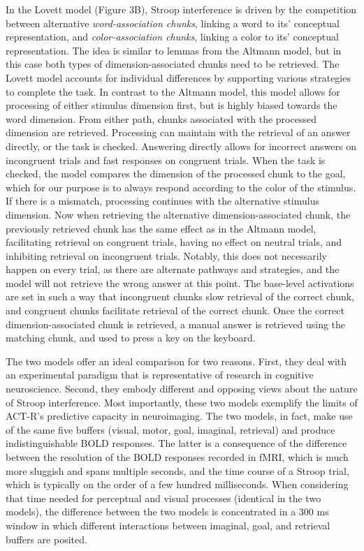 \documentclass[10pt,letterpaper]{article}
\begin{document}
In the Lovett model (Figure 3B), Stroop interference is driven by the competition between alternative \textit{word-association chunks}, linking a word to its' conceptual representation, and \textit{color-association chunks}, linking a color to its' conceptual representation. The idea is similar to lemmas from the Altmann model, but in this case both types of dimension-associated chunks need to be retrieved. The Lovett model accounts for individual differences by supporting various strategies to complete the task. In contrast to the Altmann model, this model allows for processing of either stimulus dimension first, but is highly biased towards the word dimension. From either path, chunks associated with the processed dimension are retrieved. Processing can maintain with the retrieval of an answer directly, or the task is checked. Answering directly allows for incorrect answers on incongruent trials and fast responses on congruent trials. When the task is checked, the model compares the dimension of the processed chunk to the goal, which for our purpose is to always respond according to the color of the stimulus. If there is a mismatch, processing continues with the alternative stimulus dimension. Now when retrieving the alternative dimension-associated chunk, the previously retrieved chunk has the same effect as in the Altmann model, facilitating retrieval on congruent trials, having no effect on neutral trials, and inhibiting retrieval on incongruent trials. Notably, this does not necessarily happen on every trial, as there are alternate pathways and strategies, and the model will not retrieve the wrong answer at this point. The base-level activations are set in such a way that incongruent chunks slow retrieval of the correct chunk, and congruent chunks facilitate retrieval of the correct chunk. Once the correct dimension-associated chunk is retrieved, a manual answer is retrieved using the matching chunk, and used to press a key on the keyboard. 

The two models offer an ideal comparison for two reasons. First, they deal with an experimental paradigm that is representative of research in cognitive neuroscience. Second, they embody different and opposing views about the nature of Stroop interference. Most importantly, these two models exemplify the limits of ACT-R's predictive capacity in neuroimaging. The two models, in fact, make use of the same five buffers (visual, motor, goal, imaginal, retrieval) and produce indistinguishable BOLD responses. The latter is a consequence of the difference between the resolution of the BOLD responses recorded in fMRI, which is much more sluggish and spans multiple seconds, and the time course of a Stroop trial, which is typically on the order of a few hundred milliseconds. When considering that time needed for perceptual and visual processes (identical in the two models), the difference between the two models is concentrated in a 300 ms window in which different interactions between imaginal, goal, and retrieval buffers are posited.
\end{document}
